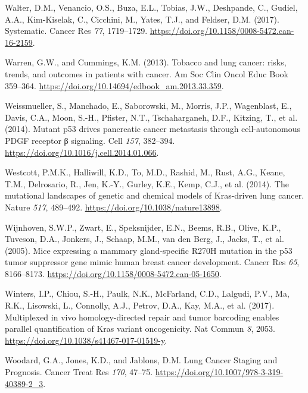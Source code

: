 \begin{CSLReferences}{0}{0}
\leavevmode{}%
Walter, D.M., Venancio, O.S., Buza, E.L., Tobias, J.W., Deshpande, C., Gudiel, A.A., Kim-Kiselak, C., Cicchini, M., Yates, T.J., and Feldser, D.M. (2017). Systematic. Cancer Res \emph{77}, 1719--1729. \url{https://doi.org/10.1158/0008-5472.can-16-2159}.

\leavevmode{}%
Warren, G.W., and Cummings, K.M. (2013). Tobacco and lung cancer: risks, trends, and outcomes in patients with cancer. Am Soc Clin Oncol Educ Book 359--364. \url{https://doi.org/10.14694/edbook_am.2013.33.359}.

\leavevmode{}%
Weissmueller, S., Manchado, E., Saborowski, M., Morris, J.P., Wagenblast, E., Davis, C.A., Moon, S.-H., Pfister, N.T., Tschaharganeh, D.F., Kitzing, T., et al. (2014). Mutant p53 drives pancreatic cancer metastasis through cell-autonomous PDGF receptor β signaling. Cell \emph{157}, 382--394. \url{https://doi.org/10.1016/j.cell.2014.01.066}.

\leavevmode{}%
Westcott, P.M.K., Halliwill, K.D., To, M.D., Rashid, M., Rust, A.G., Keane, T.M., Delrosario, R., Jen, K.-Y., Gurley, K.E., Kemp, C.J., et al. (2014). The mutational landscapes of genetic and chemical models of Kras-driven lung cancer. Nature \emph{517}, 489--492. \url{https://doi.org/10.1038/nature13898}.

\leavevmode{}%
Wijnhoven, S.W.P., Zwart, E., Speksnijder, E.N., Beems, R.B., Olive, K.P., Tuveson, D.A., Jonkers, J., Schaap, M.M., van den Berg, J., Jacks, T., et al. (2005). Mice expressing a mammary gland-specific R270H mutation in the p53 tumor suppressor gene mimic human breast cancer development. Cancer Res \emph{65}, 8166--8173. \url{https://doi.org/10.1158/0008-5472.can-05-1650}.

\leavevmode{}%
Winters, I.P., Chiou, S.-H., Paulk, N.K., McFarland, C.D., Lalgudi, P.V., Ma, R.K., Lisowski, L., Connolly, A.J., Petrov, D.A., Kay, M.A., et al. (2017). Multiplexed in vivo homology-directed repair and tumor barcoding enables parallel quantification of Kras variant oncogenicity. Nat Commun \emph{8}, 2053. \url{https://doi.org/10.1038/s41467-017-01519-y}.

\leavevmode{}%
Woodard, G.A., Jones, K.D., and Jablons, D.M. Lung Cancer Staging and Prognosis. Cancer Treat Res \emph{170}, 47--75. \url{https://doi.org/10.1007/978-3-319-40389-2_3}.


\end{CSLReferences}
